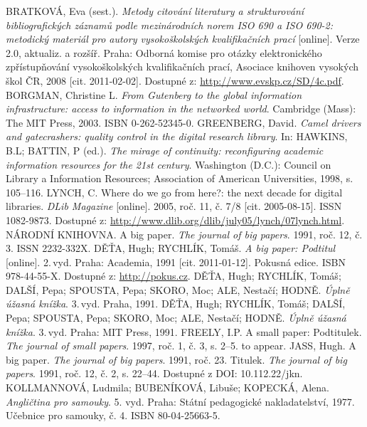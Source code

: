 \documentclass{article}
\begin{document}
\begin{thebibliography}{99}
  BRATKOVÁ, Eva (sest.). \emph{Metody citování literatury a strukturování bibliografických záznamů podle mezinárodních norem ISO 690 a ISO 690-2: metodický materiál pro autory vysokoškolských kvalifikačních prací} [online]. Verze 2.0, aktualiz. a rozšíř. Praha: Odborná komise pro otázky elektronického zpřístupňování vysokoškolských kvalifikačních prací, Asociace knihoven vysokých škol ČR, 2008 [cit. 2011-02-02]. Dostupné z: \url{http://www.evskp.cz/SD/4c.pdf}.
  BORGMAN, Christine L. \emph{From Gutenberg to the global information infrastructure: access to information in the networked world}. Cambridge (Mass): The MIT Press, 2003. ISBN 0-262-52345-0.
  GREENBERG, David. \emph{Camel drivers and gatecrashers: quality control in the digital research library}. In: HAWKINS, B.L; BATTIN, P (ed.). \emph{The mirage of continuity: reconfiguring academic information resources for the 21st  century}. Washington (D.C.): Council on Library a Information Resources; Association of American Universities, 1998, s.\,105--116.
  LYNCH, C. Where do we go from here?: the next decade for digital libraries. \emph{DLib Magazine} [online]. 2005, roč. 11, č. 7/8 [cit. 2005-08-15]. ISSN 1082-9873. Dostupné z: \url{http://www.dlib.org/dlib/july05/lynch/07lynch.html}.
  NÁRODNÍ KNIHOVNA. A big paper. \emph{The journal of big papers}. 1991, roč. 12, č. 3. ISSN 2232-332X.
  DĚŤA, Hugh; RYCHLÍK, Tomáš. \emph{A big paper: Podtitul} [online]. 2.\,vyd. Praha: Academia, 1991 [cit. 2011-01-12]. Pokusná edice. ISBN 978-44-55-X. Dostupné z: \url{http://pokus.cz}.
  DĚŤA, Hugh; RYCHLÍK, Tomáš; DALŠÍ, Pepa; SPOUSTA, Pepa; SKORO, Moc; ALE, Nestačí; HODNĚ. \emph{Úplně úžasná knížka}. 3.\,vyd. Praha, 1991.
  DĚŤA, Hugh; RYCHLÍK, Tomáš; DALŠÍ, Pepa; SPOUSTA, Pepa; SKORO, Moc; ALE, Nestačí; HODNĚ. \emph{Úplně úžasná knížka}. 3.\,vyd. Praha: MIT Press, 1991.
  FREELY, I.P. A small paper: Podtitulek. \emph{The journal of small papers}. 1997, roč. 1, č. 3, s. 2--5. to appear.
  JASS, Hugh. A big paper. \emph{The journal of big papers}. 1991, roč. 23.
  Titulek. \emph{The journal of big papers}. 1991, roč. 12, č. 2, s. 22--44. Dostupné z DOI: 10.112.22/jkn. %
  KOLLMANNOVÁ, Ludmila; BUBENÍKOVÁ, Libuše; KOPECKÁ, Alena. \emph{Angličtina pro samouky}. 5. vyd. Praha: Státní pedagogické nakladatelství, 1977. Učebnice pro samouky, č. 4. ISBN 80-04-25663-5.

\end{thebibliography}
\end{document}
